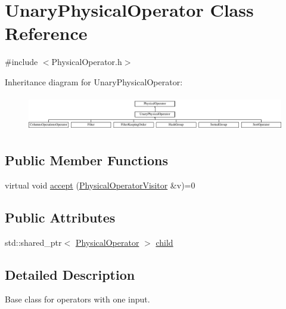 \hypertarget{class_unary_physical_operator}{\section{Unary\+Physical\+Operator Class Reference}
\label{class_unary_physical_operator}
}


{\ttfamily \#include $<$Physical\+Operator.\+h$>$}

Inheritance diagram for Unary\+Physical\+Operator\+:\begin{figure}[H]
\begin{center}
\leavevmode
\includegraphics[height=1.546961cm]{class_unary_physical_operator}
\end{center}
\end{figure}
\subsection*{Public Member Functions}
\begin{DoxyCompactItemize}
\item 
virtual void \hyperlink{class_unary_physical_operator_a3b0160d380149213561ef2ba479dbf6a}{accept} (\hyperlink{class_physical_operator_visitor}{Physical\+Operator\+Visitor} \&v)=0
\end{DoxyCompactItemize}
\subsection*{Public Attributes}
\begin{DoxyCompactItemize}
\item 
std\+::shared\+\_\+ptr$<$ \hyperlink{class_physical_operator}{Physical\+Operator} $>$ \hyperlink{class_unary_physical_operator_acb7166fc6eabb3c8fd32e7a4d0b76425}{child}
\end{DoxyCompactItemize}


\subsection{Detailed Description}
Base class for operators with one input. 

